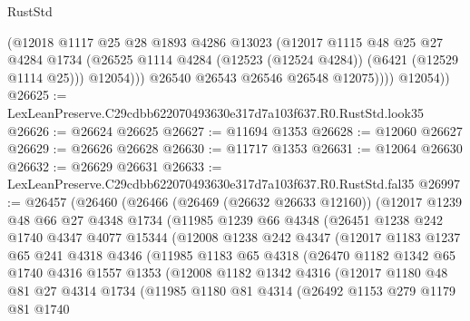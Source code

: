 \begin{lexlean}{RustStd}
\begin{coremodule}
                  (@12018
                    @1117
                    @25
                    @28
                    @1893
                    @4286
                    @13023
                    (@12017
                      @1115
                      @48
                      @25
                      @27
                      @4284
                      @1734
                      (@26525 @1114 @4284 (@12523 (@12524 @4284)) (@6421 (@12529 @1114 @25)))
                      @12054)))
                @26540
                @26543
                @26546
                @26548
                @12075))))
        @12054))
@26625 := LexLeanPreserve.C29cdbb622070493630e317d7a103f637.R0.RustStd.look35
@26626 := @26624 @26625
@26627 := @11694 @1353
@26628 := @12060 @26627
@26629 := @26626 @26628
@26630 := @11717 @1353
@26631 := @12064 @26630
@26632 := @26629 @26631
@26633 := LexLeanPreserve.C29cdbb622070493630e317d7a103f637.R0.RustStd.fal35
@26997 := @26457
    (@26460
      (@26466
        (@26469 (@26632 @26633 @12160))
        (@12017
          @1239
          @48
          @66
          @27
          @4348
          @1734
          (@11985
            @1239
            @66
            @4348
            (@26451
              @1238
              @242
              @1740
              @4347
              @4077
              @15344
              (@12008
                @1238
                @242
                @4347
                (@12017
                  @1183
                  @1237
                  @65
                  @241
                  @4318
                  @4346
                  (@11985
                    @1183
                    @65
                    @4318
                    (@26470
                      @1182
                      @1342
                      @65
                      @1740
                      @4316
                      @1557
                      @1353
                      (@12008
                        @1182
                        @1342
                        @4316
                        (@12017
                          @1180
                          @48
                          @81
                          @27
                          @4314
                          @1734
                          (@11985
                            @1180
                            @81
                            @4314
                            (@26492
                              @1153
                              @279
                              @1179
                              @81
                              @1740

\end{coremodule}
\end{lexlean}
